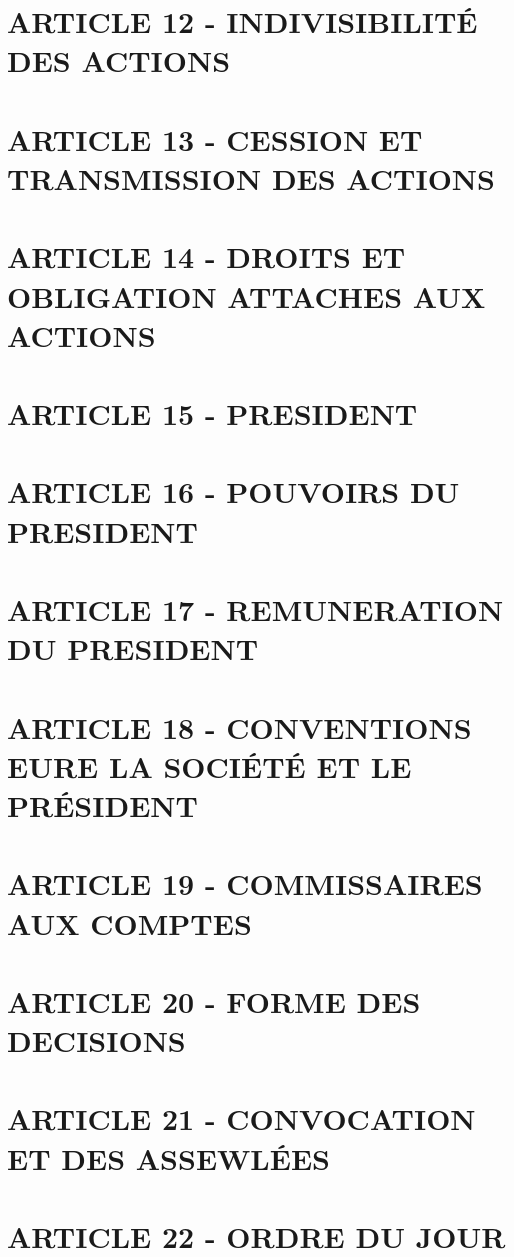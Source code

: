 \documentclass[a4paper, 11pt]{article}
\begin{document}
\section*{ARTICLE 12 - INDIVISIBILITÉ DES ACTIONS}

\section*{ARTICLE 13 - CESSION ET TRANSMISSION DES ACTIONS}

\section*{ARTICLE 14 - DROITS ET OBLIGATION ATTACHES AUX ACTIONS}

\section*{ARTICLE 15 - PRESIDENT}

\section*{ARTICLE 16 - POUVOIRS DU PRESIDENT}

\section*{ARTICLE 17 - REMUNERATION DU PRESIDENT}

\section*{ARTICLE 18 - CONVENTIONS EURE LA SOCIÉTÉ ET LE PRÉSIDENT}

\section*{ARTICLE 19 - COMMISSAIRES AUX COMPTES}

\section*{ARTICLE 20 - FORME DES DECISIONS}

\section*{ARTICLE 21 - CONVOCATION ET DES ASSEWLÉES}

\section*{ARTICLE 22 - ORDRE DU JOUR}
\end{document}
